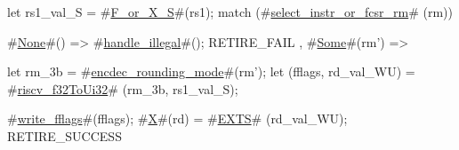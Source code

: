 let rs1_val_S = #\hyperref[sailRISCVzFzyorzyXzyS]{F\_or\_X\_S}#(rs1);
match (#\hyperref[sailRISCVzselectzyinstrzyorzyfcsrzyrm]{select\_instr\_or\_fcsr\_rm}# (rm)) {
  #\hyperref[sailRISCVzNone]{None}#() => { #\hyperref[sailRISCVzhandlezyillegal]{handle\_illegal}#(); RETIRE_FAIL },
  #\hyperref[sailRISCVzSome]{Some}#(rm') => {
    let rm_3b = #\hyperref[sailRISCVzencdeczyroundingzymode]{encdec\_rounding\_mode}#(rm');
    let (fflags, rd_val_WU) = #\hyperref[sailRISCVzriscvzyf32ToUi32]{riscv\_f32ToUi32}# (rm_3b, rs1_val_S);

    #\hyperref[sailRISCVzwritezyfflags]{write\_fflags}#(fflags);
    #\hyperref[sailRISCVzX]{X}#(rd) = #\hyperref[sailRISCVzEXTS]{EXTS}# (rd_val_WU);
    RETIRE_SUCCESS
  }
}
